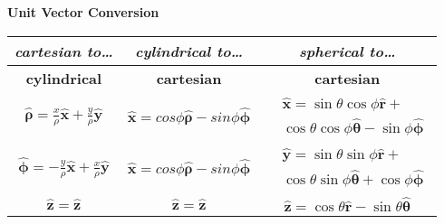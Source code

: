 \documentclass[letterpaper,landscape,10pt]{article}
\begin{document}
{\begin{multicols}{3}
\begin{center}
	\textbf{Unit Vector Conversion}\\
	\vspace{2.5pt}
	\begin{tabular}{ @{}c@{} !{\color{black}\vline} c !{\color{black}\vline} @{}c@{} }
		\textit{cartesian to\dots} & \textit{cylindrical to\dots} &
			\textit{spherical to\dots} \\
		\hline
		\textbf{cylindrical}    & \textbf{cartesian} & \textbf{cartesian} \\
		\hline

		$ \bm{\hat{\rho}} = \frac{x}{\rho}\bm{\hat{x}} +
				\frac{y}{\rho}\bm{\hat{y}} $ &
		$ \bm{\hat{x}} = cos\phi\bm{\hat{\rho}} - sin\phi\bm{\hat{\phi}} $ &
		\vspace{-8pt}
			\parbox[t]{.35\columnwidth}{\vspace{-16.5pt}
			\begin{equation*}\begin{split}
				&\bm{\hat{x}} =
					\sin\theta\cos\phi\bm{\hat{r}} + \\
					&\cos\theta\cos\phi\bm{\hat{\theta}} -
					\sin\phi\bm{\hat{\phi}}
			\end{split}\end{equation*} } \\

		$ \bm{\hat{\phi}} = -\frac{y}{\rho}\bm{\hat{x}} + 
			\frac{x}{\rho}\bm{\hat{y}} $ &
		$ \bm{\hat{x}}=cos\phi\bm{\hat{\rho}}-sin\phi\bm{\hat{\phi}} $ &
		\vspace{-8pt}
		\parbox[t]{.35\columnwidth}{\vspace{-16.5pt}
			\begin{equation*}\begin{split}
				&\bm{\hat{y}} = \sin\theta\sin\phi\bm{\hat{r}} + \\
					&\cos\theta\sin\phi\bm{\hat{\theta}} +
					\cos\phi\bm{\hat{\phi}}
				\end{split}\end{equation*} } \\

		$ \bm{\hat{z}} = \bm{\hat{z}} $ &
		$ \bm{\hat{z}} = \bm{\hat{z}} $ &
		$ \bm{\hat{z}} = \cos\theta\bm{\hat{r}}-\sin\theta\bm{\hat{\theta}} $\\


\end{tabular}
\end{center}
\end{multicols}}
\end{document}
